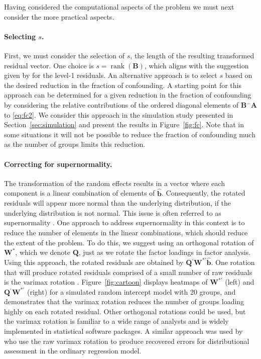 \documentclass[12pt]{article} %
\newcommand{\al}[1]{{\color{red} #1}}
\newcommand{\ginv}{\ensuremath{^{-}}}
\newcommand{\trans}{\ensuremath{^\prime}}
\DeclareMathOperator{\rank}{rank}
\begin{document}
Having considered the computational aspects of the problem we must next consider the more practical aspects. 

\paragraph{Selecting $s$.}
First, we must consider the selection of $s$,  the length of the resulting transformed residual vector. One choice is $s = \rank(\bm{B})$, which aligns with the suggestion given by \cite{HildenMinton:1995wh} for the level-1 residuals. 
An alternative approach is to select $s$ based on the desired reduction in the fraction of confounding. A starting point for this approach can be determined for a given reduction in the fraction of confounding by considering the relative contributions of the ordered diagonal elements of $\bm{B}\ginv\bm{A}$ to \eqref{eq:fc2}. We consider this approach in the simulation study presented in Section~\ref{sec:simulation} and present the results in Figure~\ref{fig:fc}. Note that in some situations it will not be possible to reduce the fraction of confounding much as the number of groups limits this reduction.

\paragraph{Correcting for supernormality.}
The transformation of the random effects results in a vector where each component is a linear combination of elements of $\widehat{\bm{b}}$. Consequently, the rotated residuals will appear more normal than the underlying distribution, if the underlying distribution is not normal. This issue is often referred to as supernormality \citep{Atkinson:1985}. One approach to address supernormality in this context is to reduce the number of elements in the linear combinations, which should reduce the extent of the problem. To do this, we suggest using an orthogonal rotation of $\bm{W}^*$, which we denote $\bm{Q}$, just as we rotate the factor loadings in factor analysis. Using this approach, the rotated residuals are obtained by $\bm{Q}\trans \bm{W}^{*\prime} \widehat{\bm{b}}$. One rotation that will produce rotated residuals comprised of a small number of raw residuals is the varimax rotation \citep{Johnson:2007}. Figure~\ref{fig:cartoon} displays heatmaps of $\bm{W}^{*\prime}$ (left) and $\bm{Q}\trans\bm{W}^{*\prime}$ (right) for a simulated random intercept model with 20 groups, and demonstrates that the varimax rotation reduces the number of groups loading highly on each rotated residual.  Other orthogonal rotations could be used, but the varimax rotation is familiar to a wide range of analysts and is widely implemented in statistical software packages. A similar approach was used by \cite{Jensen:1999iu} who use the raw varimax rotation to produce recovered errors for distributional assessment in the ordinary regression model.
\end{document}
